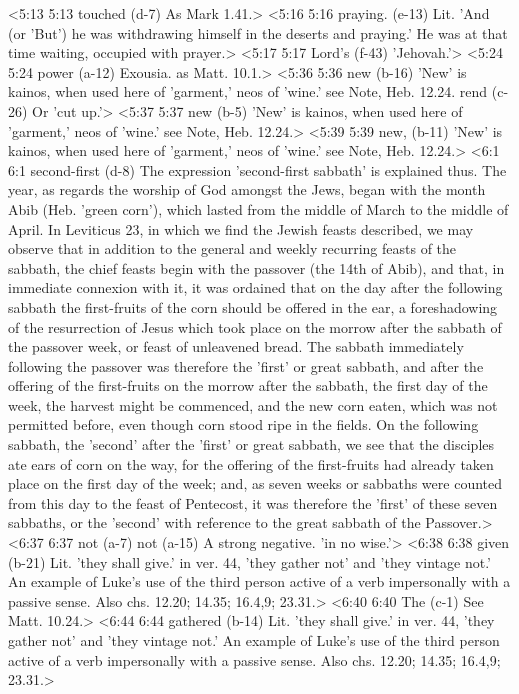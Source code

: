 <5:13 5:13  touched (d-7)  As Mark 1.41.>
<5:16 5:16  praying. (e-13)  Lit. 'And (or 'But') he was withdrawing himself in the  deserts and praying.' He was at that time waiting, occupied  with prayer.>
<5:17 5:17  Lord's (f-43)  'Jehovah.'>
<5:24 5:24  power (a-12)  Exousia. as Matt. 10.1.>
<5:36 5:36  new (b-16) 'New' is kainos, when used here of 'garment,' neos of  'wine.' see Note, Heb. 12.24.
  rend (c-26)  Or 'cut up.'>
<5:37 5:37  new (b-5) 'New' is kainos, when used here of 'garment,' neos of  'wine.' see Note, Heb. 12.24.>
<5:39 5:39  new, (b-11)  'New' is kainos, when used here of 'garment,' neos of  'wine.' see Note, Heb. 12.24.>
<6:1 6:1  second-first (d-8)  The expression 'second-first sabbath' is explained thus. The  year, as regards the worship of God amongst the Jews, began  with the month Abib (Heb. 'green corn'), which lasted from the  middle of March to the middle of April. In Leviticus 23, in  which we find the Jewish feasts described, we may observe that  in addition to the general and weekly recurring feasts of the  sabbath, the chief feasts begin with the passover (the 14th of  Abib), and that, in immediate connexion with it, it was  ordained that on the day after the following sabbath the  first-fruits of the corn should be offered in the ear, a  foreshadowing of the resurrection of Jesus which took place on  the morrow after the sabbath of the passover week, or feast of  unleavened bread. The sabbath immediately following the  passover was therefore the 'first' or great sabbath, and after  the offering of the first-fruits on the morrow after the  sabbath, the first day of the week, the harvest might be  commenced, and the new corn eaten, which was not permitted  before, even though corn stood ripe in the fields. On the  following sabbath, the 'second' after the 'first' or great  sabbath, we see that the disciples ate ears of corn on the way,  for the offering of the first-fruits had already taken place on  the first day of the week; and, as seven weeks or sabbaths were  counted from this day to the feast of Pentecost, it was  therefore the 'first' of these seven sabbaths, or the 'second'  with reference to the great sabbath of the Passover.>
<6:37 6:37  not (a-7)  not (a-15)
  A strong negative. 'in no wise.'>
<6:38 6:38  given (b-21) Lit. 'they shall give.' in ver. 44, 'they gather not' and 'they vintage not.' An example of Luke's use of the third person active of a verb impersonally with a passive sense. Also chs. 12.20; 14.35; 16.4,9; 23.31.>
<6:40 6:40  The (c-1)  See Matt. 10.24.>
<6:44 6:44  gathered (b-14)  Lit. 'they shall give.' in ver. 44, 'they gather not' and  'they vintage not.' An example of Luke's use of the third  person active of a verb impersonally with a passive sense. Also  chs. 12.20; 14.35; 16.4,9; 23.31.>
